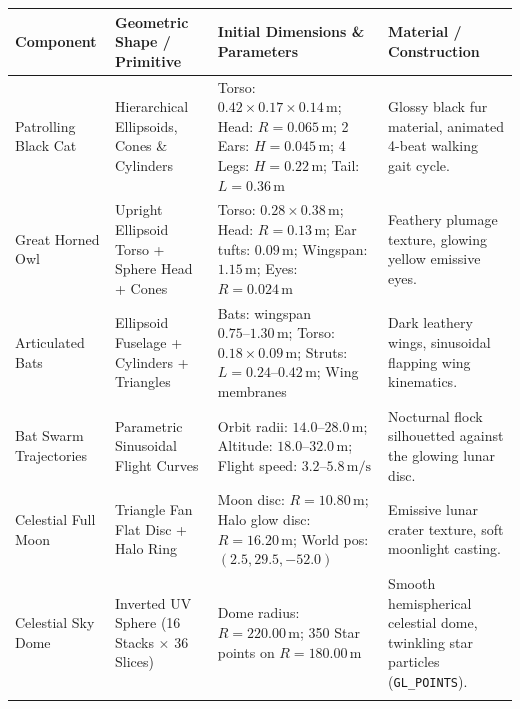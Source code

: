 \documentclass[10pt,a4paper,oneside]{article}
\begin{document}
\begin{longtable}{>{\raggedright\arraybackslash}p{}>{\raggedright\arraybackslash}p{}>{\raggedright\arraybackslash}p{}>{\raggedright\arraybackslash}p{}}
\toprule
\textbf{Component} & \textbf{Geometric Shape / Primitive} & \textbf{Initial Dimensions \& Parameters} & \textbf{Material / Construction} \\
\midrule
\endhead

Patrolling Black Cat & Hierarchical Ellipsoids, Cones \& Cylinders & Torso: $0.42\times 0.17\times 0.14\,\mathrm{m}$; Head: $R=0.065\,\mathrm{m}$; 2 Ears: $H=0.045\,\mathrm{m}$; 4 Legs: $H=0.22\,\mathrm{m}$; Tail: $L=0.36\,\mathrm{m}$ & Glossy black fur material, animated 4-beat walking gait cycle.\\\addlinespace[3pt]

Great Horned Owl & Upright Ellipsoid Torso + Sphere Head + Cones & Torso: $0.28\times 0.38\,\mathrm{m}$; Head: $R=0.13\,\mathrm{m}$; Ear tufts: $0.09\,\mathrm{m}$; Wingspan: $1.15\,\mathrm{m}$; Eyes: $R=0.024\,\mathrm{m}$ & Feathery plumage texture, glowing yellow emissive eyes.\\\addlinespace[3pt]

Articulated Bats & Ellipsoid Fuselage + Cylinders + Triangles & 22 Bats: wingspan $0.75\text{--}1.30\,\mathrm{m}$; Torso: $0.18\times 0.09\,\mathrm{m}$; Struts: $L=0.24\text{--}0.42\,\mathrm{m}$; Wing membranes & Dark leathery wings, sinusoidal flapping wing kinematics.\\\addlinespace[3pt]

Bat Swarm Trajectories & Parametric Sinusoidal Flight Curves & Orbit radii: $14.0\text{--}28.0\,\mathrm{m}$; Altitude: $18.0\text{--}32.0\,\mathrm{m}$; Flight speed: $3.2\text{--}5.8\,\mathrm{m/s}$ & Nocturnal flock silhouetted against the glowing lunar disc.\\\addlinespace[3pt]

Celestial Full Moon & Triangle Fan Flat Disc + Halo Ring & Moon disc: $R=10.80\,\mathrm{m}$; Halo glow disc: $R=16.20\,\mathrm{m}$; World pos: $(2.5, 29.5, -52.0)$ & Emissive lunar crater texture, soft moonlight casting.\\\addlinespace[3pt]

Celestial Sky Dome & Inverted UV Sphere (16 Stacks $\times$ 36 Slices) & Dome radius: $R=220.00\,\mathrm{m}$; 350 Star points on $R=180.00\,\mathrm{m}$ & Smooth hemispherical celestial dome, twinkling star particles (\texttt{GL\_POINTS}).\\\addlinespace[3pt]


\end{longtable}
\end{document}
